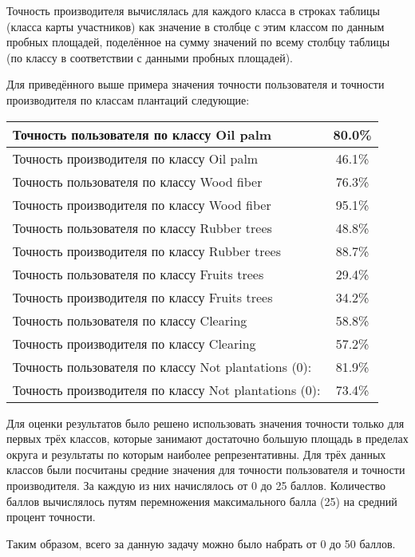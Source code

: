 Точность производителя вычислялась для каждого класса в строках таблицы (класса карты участников) как значение в столбце с этим классом по данным пробных площадей, поделённое на сумму значений по всему столбцу таблицы (по классу в соответствии с данными пробных площадей).

Для приведённого выше примера значения точности пользователя и точности производителя по классам плантаций следующие:

\begin{center}
    \begin{tabular}{|l|c|}
        \hline
        Точность пользователя по классу Oil palm & 80.0\% \\
        \hline
        Точность производителя по классу Oil palm & 46.1\% \\
        \hline
        Точность пользователя по классу Wood fiber & 76.3\% \\
        \hline
        Точность производителя по классу Wood fiber & 95.1\% \\
        \hline
        Точность пользователя по классу Rubber trees & 48.8\% \\
        \hline
        Точность производителя по классу Rubber trees & 88.7\% \\
        \hline
        Точность пользователя по классу Fruits trees & 29.4\% \\
        \hline
        Точность производителя по классу Fruits trees & 34.2\% \\
        \hline
        Точность пользователя по классу Clearing & 58.8\% \\
        \hline
        Точность производителя по классу Clearing & 57.2\% \\
        \hline
        Точность пользователя по классу Not plantations (0): & 81.9\% \\
        \hline
        Точность производителя по классу Not plantations (0): & 73.4\% \\
        \hline
    \end{tabular}
\end{center}

Для оценки результатов было решено использовать значения точности только для первых трёх классов, которые занимают достаточно большую площадь в пределах округа и результаты по которым наиболее репрезентативны. Для трёх данных классов были посчитаны средние значения для точности пользователя и точности производителя. За каждую из них начислялось от 0 до 25 баллов. Количество баллов вычислялось путям перемножения максимального балла (25) на средний процент точности.

Таким образом, всего за данную задачу можно было набрать от 0 до 50 баллов.